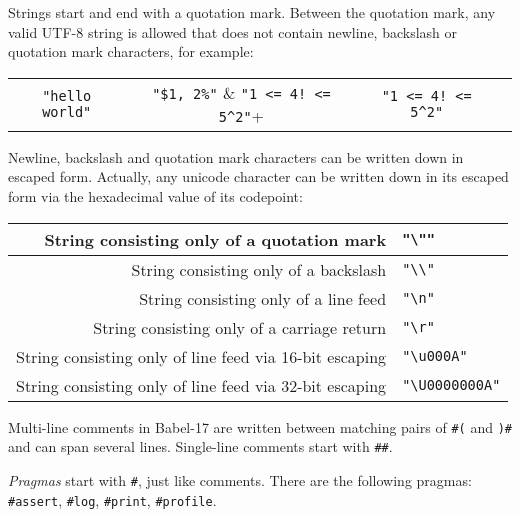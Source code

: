 \documentclass[11pt]{amsart}
\begin{document}
Strings start and end with a quotation mark. Between the quotation mark, any valid UTF-8 string is allowed that does not contain newline, backslash or quotation mark characters, for example:
\begin{center}
\begin{tabular}{cccc}
\verb+"hello world"+ & \verb+"$1, 2%"+ & \verb+"1 <= 4! <= 5^2"+
\end{tabular}
\end{center}
Newline, backslash and quotation mark characters can be written down in escaped form. Actually, any unicode character can be written down in its escaped form via the hexadecimal value of its codepoint: 
\begin{center}
\begin{tabular}{r|l}
String consisting only of a quotation mark & \verb+"\""+\\\hline
String consisting only of a backslash & \verb+"\\"+ \\\hline
String consisting only of a line feed & \verb+"\n"+ \\\hline
String consisting only of a carriage return & \verb+"\r"+ \\\hline
String consisting only of line feed via 16-bit escaping & \verb+"\u000A"+ \\\hline
String consisting only of line feed via 32-bit escaping & \verb+"\U0000000A"+
\end{tabular}
\end{center}

Multi-line comments in Babel-17 are written between matching pairs of \verb+#(+ and \verb+)#+ and can span several lines. 
Single-line comments start with \verb+##+. 

\emph{Pragmas} start with \verb+#+, just like comments. There are the following pragmas: \verb+#assert+, \verb+#log+, \verb+#print+, \verb+#profile+. 
\end{document}

